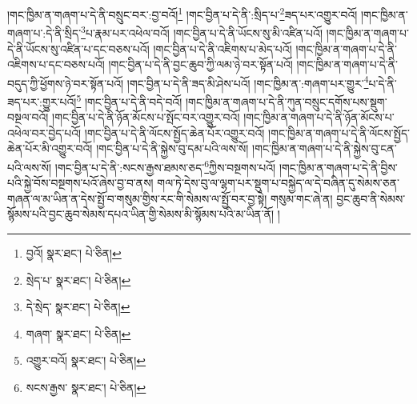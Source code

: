 །གང་ཁྱིམ་ན་གཞག་པ་དེ་ནི་བསྲུང་བར་:བྱ་བའོ།\footnote{བྱའོ།  སྣར་ཐང་།  པེ་ཅིན། } །གང་བྱིན་པ་དེ་ནི་:སྲིད་པ་\footnote{སྲེད་པ་  སྣར་ཐང་།  པེ་ཅིན། }ཟད་པར་འགྱུར་བའོ། །གང་ཁྱིམ་ན་གཞག་པ་:དེ་ནི་སྲིད་\footnote{དེ་སྲེད་  སྣར་ཐང་།  པེ་ཅིན། }པ་རྣམ་པར་འཕེལ་བའོ། །གང་བྱིན་པ་དེ་ནི་ཡོངས་སུ་མི་འཛིན་པའོ། །གང་ཁྱིམ་ན་གཞག་པ་དེ་ནི་ཡོངས་སུ་འཛིན་པ་དང་བཅས་པའོ། །གང་བྱིན་པ་དེ་ནི་འཇིགས་པ་མེད་པའོ། །གང་ཁྱིམ་ན་གཞག་པ་དེ་ནི་འཇིགས་པ་དང་བཅས་པའོ། །གང་བྱིན་པ་དེ་ནི་བྱང་ཆུབ་ཀྱི་ལམ་ཉེ་བར་སྟོན་པའོ། །གང་ཁྱིམ་ན་གཞག་པ་དེ་ནི་བདུད་ཀྱི་ཕྱོགས་ཉེ་བར་སྟོན་པའོ། །གང་བྱིན་པ་དེ་ནི་ཟད་མི་ཤེས་པའོ། །གང་ཁྱིམ་ན་:གཞག་པར་གྱུར་\footnote{གཞག་  སྣར་ཐང་།  པེ་ཅིན། }པ་དེ་ནི་ཟད་པར་:གྱུར་པའོ།\footnote{འགྱུར་བའོ།  སྣར་ཐང་།  པེ་ཅིན། } །གང་བྱིན་པ་དེ་ནི་བདེ་བའོ། །གང་ཁྱིམ་ན་གཞག་པ་དེ་ནི་ཀུན་བསྲུང་དགོས་པས་སྡུག་བསྔལ་བའོ། །གང་བྱིན་པ་དེ་ནི་ཉོན་མོངས་པ་སྤོང་བར་འགྱུར་བའོ། །གང་ཁྱིམ་ན་གཞག་པ་དེ་ནི་ཉོན་མོངས་པ་འཕེལ་བར་བྱེད་པའོ། །གང་བྱིན་པ་དེ་ནི་ལོངས་སྤྱོད་ཆེན་པོར་འགྱུར་བའོ། །གང་ཁྱིམ་ན་གཞག་པ་དེ་ནི་ལོངས་སྤྱོད་ཆེན་པོར་མི་འགྱུར་བའོ། །གང་བྱིན་པ་དེ་ནི་སྐྱེས་བུ་དམ་པའི་ལས་སོ། །གང་ཁྱིམ་ན་གཞག་པ་དེ་ནི་སྐྱེས་བུ་ངན་པའི་ལས་སོ། །གང་བྱིན་པ་དེ་ནི་:སངས་རྒྱས་ཐམས་ཅད་\footnote{སངས་རྒྱས་  སྣར་ཐང་།  པེ་ཅིན། }ཀྱིས་བསྔགས་པའོ། །གང་ཁྱིམ་ན་གཞག་པ་དེ་ནི་བྱིས་པའི་སྐྱེ་བོས་བསྔགས་པའོ་ཞེས་བྱ་བ་ནས། གལ་ཏེ་དེས་བུ་ལ་ལྷག་པར་སྡུག་པ་བསྐྱེད་ལ་དེ་བཞིན་དུ་སེམས་ཅན་གཞན་ལ་མ་ཡིན་ན་དེས་སྤྱོ་བ་གསུམ་གྱིས་རང་གི་སེམས་ལ་སྤྱོ་བར་བྱ་སྟེ། གསུམ་གང་ཞེ་ན། བྱང་ཆུབ་ནི་སེམས་སྙོམས་པའི་བྱང་ཆུབ་སེམས་དཔའ་ཡིན་གྱི་སེམས་མི་སྙོམས་པའི་མ་ཡིན་ནོ། །
